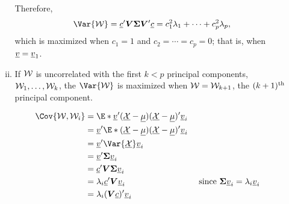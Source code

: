 \begin{itemize}
\begin{enumerate}[i.]
\begin{framed}
                              Therefore,
                              \[ \Var{\RV{W}}=\Vector{c}'\Matrix{V}\Matrix{\Sigma}\Matrix{V}'\Vector{c}=c_1^2\lambda_1+\cdots+c_p^2\lambda_p, \]
                              which is maximized when $ c_1=1 $ and $ c_2=\cdots=c_p=0 $; that is,
                              when $ \underline{v}=\underline{v}_1 $.
                        \end{framed}
                  \item If $ \mathcal{W} $ is uncorrelated with the first $ k<p $ principal components,
                        $ \mathcal{W}_1,\ldots,\mathcal{W}_k $, the $ \Var{\RV{W}} $ is maximized when $ \mathcal{W}=\mathcal{W}_{k+1} $,
                        the $ (k+1)\textsuperscript{th} $ principal component.
                        \begin{framed}
                              \begin{align*}
                                    \Cov{\RV{W},\RV{W}_i}
                                     & =\E*{\Vector{v}'(\RVector{X}-\Vector{\mu})(\RVector{X}-\Vector{\mu})' \Vector{v}_i}                                                                           \\
                                     & =\Vector{v}'\E*{(\RVector{X}-\Vector{\mu})(\RVector{X}-\Vector{\mu})'}\Vector{v}_i                                                                            \\
                                     & =\Vector{v}'\Var{\RVector{X}}\Vector{v}_i                                                                                                                     \\
                                     & =\Vector{v}'\Matrix{\Sigma}\Vector{v}_i                                                                                                                       \\
                                     & =\Vector{c}' \Matrix{V}\Matrix{\Sigma}\Vector{v}_i                                                                                                            \\
                                     & =\lambda_i \Vector{c}' \Matrix{V}\Vector{v}_i                                       &  & \text{ since $ \Matrix{\Sigma}\Vector{v}_i=\lambda_i \Vector{v}_i $} \\
                                     & =\lambda_i(\Matrix{V}\Vector{c})'\Vector{v}_i                                                                                                                 \\

\end{align*}
\end{framed}
\end{enumerate}
\end{itemize}
